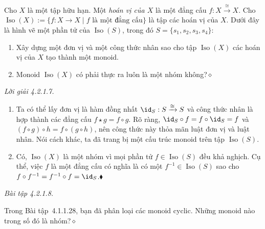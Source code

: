 Cho $X$ là một tập hữu hạn. Một \emph{hoán vị của $X$} là một đẳng cấu $f:X\xrightarrow{\cong}X$. Cho $\operatorname{Iso}(X):=\{f:X\to X\mid f\text{ là một đẳng cấu}\}$ là tập các hoán vị của $X$. Dưới đây là hình vẽ một phần tử của $\operatorname{Iso}(S)$, trong đó $S=\{s_1,s_2,s_3,s_4\}$:
\begin{center}
\end{center}
\begin{enumerate}[label=\alph*.]
\item Xây dựng một đơn vị và một công thức nhân sao cho tập $\operatorname{Iso}(X)$ các hoán vị của $X$ tạo thành một monoid.
\item Monoid $\operatorname{Iso}(X)$ có phải thực ra luôn là một nhóm không?\nobreak\hfill$\diamond$
\end{enumerate}

\noindent\textit{Lời giải 4.2.1.7.}\keepwithnext
\begin{enumerate}[label=\alph*.]
\item Ta có thể lấy đơn vị là hàm đồng nhất $\id_S:S\xrightarrow{\cong}S$ và công thức nhân là hợp thành các đẳng cấu $f\star g=f\circ g$. Rõ ràng, $\id_S\circ f=f\circ\id_S=f$ và $(f\circ g)\circ h=f\circ(g\circ h)$, nên công thức này thỏa mãn luật đơn vị và luật nhân. Nói cách khác, ta đã trang bị một cấu trúc monoid trên tập $\operatorname{Iso}(S)$.
\item Có, $\operatorname{Iso}(X)$ là một nhóm vì mọi phần tử $f\in\operatorname{Iso}(S)$ đều khả nghịch. Cụ thể, việc $f$ là một đẳng cấu có nghĩa là có một $f^{-1}\in\operatorname{Iso}(S)$ sao cho $f\circ f^{-1}=f^{-1}\circ f=\id_S$.\nobreak\hfill$\blacklozenge$
\end{enumerate}

\noindent\textit{Bài tập 4.2.1.8.}\keepwithnext

Trong Bài tập~4.1.1.28, bạn đã phân loại các monoid cyclic. Những monoid nào trong số đó là nhóm?\hfill$\diamond$

